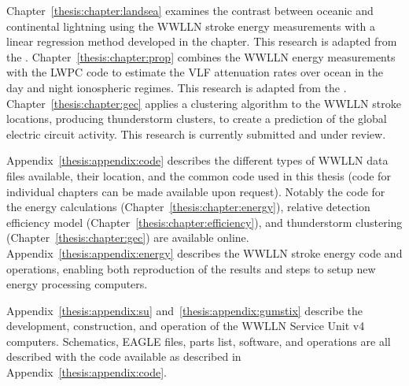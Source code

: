 Chapter~\ref{thesis:chapter:landsea} examines the contrast between oceanic and continental lightning using the WWLLN stroke energy measurements with a linear regression method developed in the chapter.
This research is adapted from the \citet{Hutchins2013}.
Chapter~\ref{thesis:chapter:prop} combines the WWLLN energy measurements with the LWPC code to estimate the VLF attenuation rates over ocean in the day and night ionospheric regimes.
This research is adapted from the \citet{Hutchins2013a}.
Chapter~\ref{thesis:chapter:gec} applies a clustering algorithm to the WWLLN stroke locations, producing thunderstorm clusters, to create a prediction of the global electric circuit activity.
This research is currently submitted and under review.

Appendix~\ref{thesis:appendix:code} describes the different types of WWLLN data files available, their location, and the common code used in this thesis (code for individual chapters can be made available upon request).
Notably the code for the energy calculations (Chapter~\ref{thesis:chapter:energy}), relative detection efficiency model (Chapter~\ref{thesis:chapter:efficiency}), and thunderstorm clustering (Chapter~\ref{thesis:chapter:gec}) are available online.
Appendix~\ref{thesis:appendix:energy} describes the WWLLN stroke energy code and operations, enabling both reproduction of the results and steps to setup new energy processing computers.

Appendix~\ref{thesis:appendix:su} and~\ref{thesis:appendix:gumstix} describe the development, construction, and operation of the WWLLN Service Unit v4 computers.
Schematics, EAGLE files, parts list, software, and operations are all described with the code available as described in Appendix~\ref{thesis:appendix:code}.
